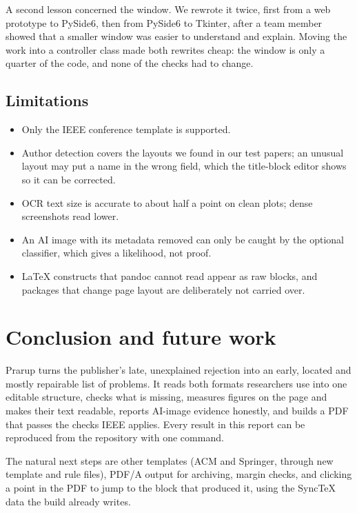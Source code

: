 \documentclass[11pt,a4paper,oneside,openany]{book}
\begin{document}
A second lesson concerned the window. We rewrote it twice, first from a web prototype to PySide6, then from
PySide6 to Tkinter, after a team member showed that a smaller window was easier to understand and explain.
Moving the work into a controller class made both rewrites cheap: the window is only a quarter of the code,
and none of the checks had to change.

\section{Limitations}
\begin{itemize}
\item Only the IEEE conference template is supported.
\item Author detection covers the layouts we found in our test papers; an unusual layout may put a name in
the wrong field, which the title-block editor shows so it can be corrected.
\item OCR text size is accurate to about half a point on clean plots; dense screenshots read lower.
\item An AI image with its metadata removed can only be caught by the optional classifier, which gives a
likelihood, not proof.
\item \LaTeX{} constructs that pandoc cannot read appear as raw blocks, and packages that change page layout
are deliberately not carried over.
\end{itemize}

\chapter{Conclusion and future work}\label{ch:conc}

Prarup turns the publisher's late, unexplained rejection into an early, located and mostly repairable list
of problems. It reads both formats researchers use into one editable structure, checks what is missing,
measures figures on the page and makes their text readable, reports AI-image evidence honestly, and builds
a PDF that passes the checks IEEE applies. Every result in this report can be reproduced from the
repository with one command.

The natural next steps are other templates (ACM and Springer, through new template and rule files),
PDF/A output for archiving, margin checks, and clicking a point in the PDF to jump to the block that produced
it, using the SyncTeX data the build already writes.
\end{document}
